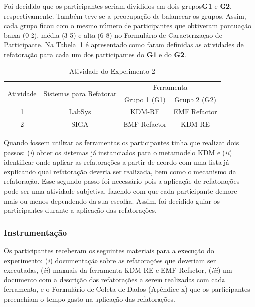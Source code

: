Foi decidido que os participantes seriam divididos em dois grupos\textbf{G1} e \textbf{G2}, respectivamente. Também teve-se a preocupação de balancear os grupos. Assim, cada grupo ficou com o mesmo número de participantes que obtiveram pontuação baixa (0-2), média (3-5) e alta (6-8) no Formulário de Caracterização de Participante. Na Tabela~\ref{tab:agrupamento_experimento2} é apresentado como faram definidas as atividades de refatoração para cada um dos participantes do \textbf{G1} e do \textbf{G2}.


\begin{table}[h]
\centering
\caption{Atividade do Experimento 2}
\label{tab:agrupamento_experimento2}
\begin{tabular}{|c|c|c|c|}
\hline
\multirow{2}{*}{Atividade} & \multirow{2}{*}{Sistemas para Refatorar} & \multicolumn{2}{c|}{Ferramenta} \\ \cline{3-4} 
                           &                                          & Grupo 1 (G1)   & Grupo 2 (G2)   \\ \hline
1                          & LabSys                                   & KDM-RE        & EMF Refactor   \\ \hline
2                          & SIGA                                     & EMF Refactor   & KDM-RE         \\ \hline
\end{tabular}
\end{table}

Quando fossem utilizar as ferramentas os participantes tinha que realizar dois passos: (\textit{i}) obter os sistemas já instanciados para o metamodelo KDM e (\textit{ii}) identificar onde aplicar as refatorações a partir de acordo com uma lista já explicando qual refatoração deveria ser realizada, bem como o mecanismo da refatoração. Esse segundo passo foi necessário pois a aplicação de refatorações pode ser uma atividade subjetiva, fazendo com que cada participante demore mais ou menos dependendo da sua escolha. Assim, foi decidido guiar os participantes durante a aplicação das refatorações. 

\subsubsection{Instrumentação}

Os participantes receberam os seguintes materiais para a execução do experimento: (\textit{i}) documentação sobre as refatorações que deveriam ser executadas, (\textit{ii}) manuais da ferramenta KDM-RE e EMF Refactor, (\textit{iii}) um documento com a descrição das refatorações a serem realizadas com cada ferramenta, e o Formulário de Coleta de Dados (Apêndice x) que os participantes preenchiam o tempo gasto na aplicação das refatorações.


